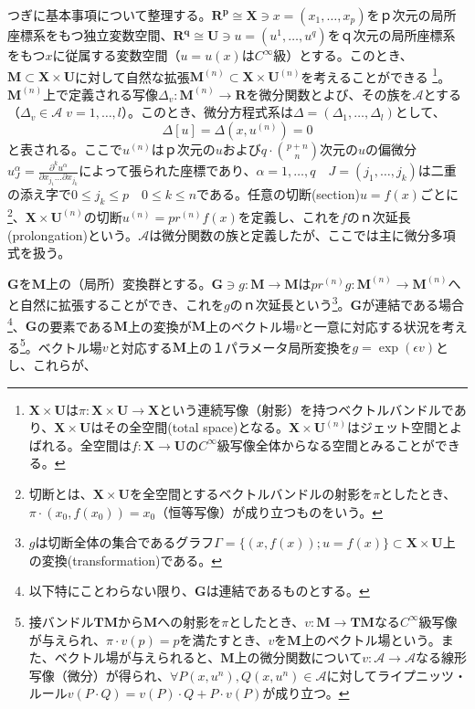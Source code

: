 \documentclass[a4paper, 11pt]{report}
\theoremstyle{definition}
\begin{document}
 つぎに基本事項について整理する。$\mathbf{R^p}\cong \mathbf{X}\ni x=(x_1,\dots,x_p)$をｐ次元の局所座標系をもつ独立変数空間、$\mathbf{R^q}\cong \mathbf{U}\ni u=(u^1,\dots,u^q)$をｑ次元の局所座標系をもつ$x$に従属する変数空間（$u=u(x)$は$C^\infty$級）とする。このとき、$\mathbf{M}\subset \mathbf{X}\times \mathbf{U}$に対して自然な拡張$\mathbf{M}^{(n)}\subset \mathbf{X}\times \mathbf{U}^{(n)}$を考えることができる
\footnote{$\mathbf{X}\times \mathbf{U}$は$\pi :\mathbf{X}\times \mathbf{U}\longrightarrow \mathbf{X}$という連続写像（射影）を持つベクトルバンドルであり、$\mathbf{X}\times \mathbf{U}$はその全空間(total space)となる。$\mathbf{X}\times \mathbf{U}^{(n)}$はジェット空間とよばれる。全空間は$f:\mathbf{X}\longrightarrow \mathbf{U}$の$C^\infty$級写像全体からなる空間とみることができる。}。$\mathbf{M}^{(n)}$上で定義される写像$\varDelta_v:\mathbf{M}^{(n)}\longrightarrow \mathbf{R}$を微分関数とよび、その族を$\mathcal{A}$とする（$\varDelta_v\in \mathcal{A}\; v=1,\dots,l$）。このとき、微分方程式系は$\varDelta=(\varDelta_1,\dots,\varDelta_l)$として、
\begin{equation} 
\varDelta[u] = \varDelta(x,u^{(n)}) = 0 %
\end{equation}
と表される。ここで$u^{(n)}$はｐ次元の$u$および$q\cdot \binom{p+n}{n}$次元の$u$の偏微分$u^\alpha_J=\frac{\partial^ku^\alpha}{\partial x_{j_1}\dots\partial x_{j_k}}$によって張られた座標であり、$\alpha=1,\dots,q\quad J=(j_1,\dots,j_k)$は二重の添え字で$0\leq j_k\leq p\quad 0\leq k\leq n$である。任意の切断(section)$u=f(x)$ごとに\footnote{切断とは、$\mathbf{X}\times \mathbf{U}$を全空間とするベクトルバンドルの射影を$\pi$としたとき、$\pi\cdot(x_0,f(x_0))=x_0$（恒等写像）が成り立つものをいう。}、$\mathbf{X}\times \mathbf{U}^{(n)}$の切断$u^{(n)}=pr^{(n)}f(x)$を定義し、これを$f$のｎ次延長(prolongation)という。$\mathcal{A}$は微分関数の族と定義したが、ここでは主に微分多項式を扱う。

 $\mathbf{G}$を$\mathbf{M}$上の（局所）変換群とする。$\mathbf{G}\ni g:\mathbf{M}\longrightarrow \mathbf{M}$は$pr^{(n)}g:\mathbf{M}^{(n)}\longrightarrow \mathbf{M}^{(n)}$へと自然に拡張することができ、これを$g$のｎ次延長という\footnote{$g$は切断全体の集合であるグラフ$\Gamma=\{ (x, f(x)); u=f(x) \}\subset \mathbf{X}\times \mathbf{U}$上の変換(transformation)である。}。$\mathbf{G}$が連結である場合\footnote{以下特にことわらない限り、$\mathbf{G}$は連結であるものとする。}、$\mathbf{G}$の要素である$\mathbf{M}$上の変換が$\mathbf{M}$上のベクトル場$v$と一意に対応する状況を考える\footnote{接バンドル$\mathbf{TM}$から$\mathbf{M}$への射影を$\pi$としたとき、$v:\mathbf{M}\longrightarrow\mathbf{TM}$なる$C^\infty$級写像が与えられ、$\pi\cdot v(p)=p$を満たすとき、$v$を$\mathbf{M}$上のベクトル場という。また、ベクトル場が与えられると、$\mathbf{M}$上の微分関数について$v:\mathcal{A}\longrightarrow \mathcal{A}$なる線形写像（微分）が得られ、$\forall P(x,u^{n}),Q(x,u^{n})\in \mathcal{A}$に対してライプニッツ・ルール$v(P\cdot Q)=v(P)\cdot Q+P\cdot v(P)$が成り立つ。}。ベクトル場$v$と対応する$\mathbf{M}$上の１パラメータ局所変換を$g=\exp (\epsilon v)$とし、これらが、
\end{document}
